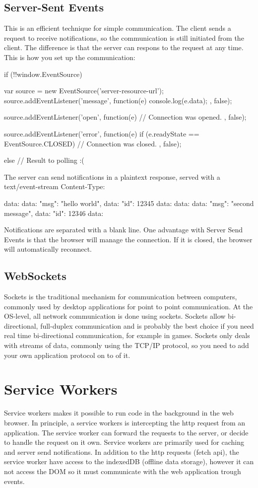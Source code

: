 \section{Server-Sent Events}
This is an efficient technique for simple communication. The client sends a request to receive notifications, so the communication is still initiated from the client. The difference is that the server can respons to the request at any time. This is how you set up the communication:
\begin{Code}
if (!!window.EventSource) {
  var source = new EventSource('server-resource-url');
  source.addEventListener('message', function(e) {
    console.log(e.data);
  }, false);

  source.addEventListener('open', function(e) {
    // Connection was opened.
  }, false);

  source.addEventListener('error', function(e) {
    if (e.readyState == EventSource.CLOSED) {
      // Connection was closed.
    }
  }, false);

} else {
  // Result to polling :(
}

\end{Code}
The server can send notifications in a plaintext response, served with a text/event-stream Content-Type:
\begin{Code}
data: {\n
data: "msg": "hello world",\n
data: "id": 12345\n
data: }\n\n
data: {\n
data: "msg": "second message",\n
data: "id": 12346\n
data: }\n\n
\end{Code}
Notifications are separated with a blank line. One advantage with Server Send Events is that the browser will manage the connection. If it is closed, the browser will automatically reconnect.

\section{WebSockets}
Sockets is the traditional mechanism for communication between computers, commonly used by desktop applications for point to point communication. At the OS-level, all network communication is done using sockets. Sockets allow bi-directional, full-duplex communication and is probably the best choice if you need real time bi-directional communication, for example in games. Sockets only deals with streams of data, commonly using the TCP/IP protocol, so you need to add your own application protocol on to of it.

\chapter{Service Workers} \label{chapter:service:workers}
Service workers makes it possible to run code in the background in the web browser. In principle, a service workers is intercepting the http request from an application. The service worker can forward the requests to the server, or decide to handle the request on it own. Service workers are primarily used for caching and server send notifications. In addition to the http requests (fetch api), the service worker have access to the indexedDB (offline data storage), however it can not access the DOM so it must communicate with the web application trough events.

